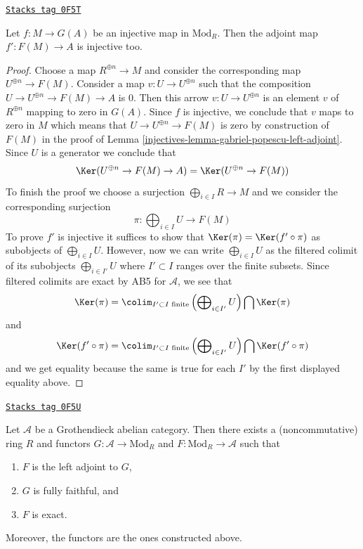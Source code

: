 \begin{lemma}[F G monos]
\label{injectives-lemma-F-G-monos}
\href{https://stacks.math.columbia.edu/tag/0F5T}{\texttt{Stacks tag 0F5T}}

Let $f : M \to G(A)$ be an injective map in $\text{Mod}_R$.
Then the adjoint map $f' : F(M) \to A$ is injective too.
\end{lemma}

\begin{proof}

Choose a map $R^{\oplus n} \to M$ and consider the corresponding map
$U^{\oplus n} \to F(M)$. Consider a map $v : U \to U^{\oplus n}$
such that the composition $U \to U^{\oplus n} \to F(M) \to A$ is $0$.
Then this arrow $v : U \to U^{\oplus n}$ is an element
$v$ of $R^{\oplus n}$ mapping to zero in $G(A)$. Since $f$ is injective,
we conclude that $v$ maps to zero in $M$ which means that
$U \to U^{\oplus n} \to F(M)$ is zero by construction of $F(M)$
in the proof of Lemma \ref{injectives-lemma-gabriel-popescu-left-adjoint}.
Since $U$ is a generator we conclude that
$$
\Ker(U^{\oplus n} \to F(M) \to A) = \Ker(U^{\oplus n} \to F(M))
$$
To finish the proof we choose a surjection $\bigoplus_{i \in I} R \to M$
and we consider the corresponding surjection
$$
\pi : \bigoplus\nolimits_{i \in I} U \longrightarrow F(M)
$$
To prove $f'$ is injective it suffices to show that
$\Ker(\pi) = \Ker(f' \circ \pi)$ as subobjects of $\bigoplus_{i \in I} U$.
However, now we can write $\bigoplus_{i \in I} U$ as the filtered colimit
of its subobjects $\bigoplus_{i \in I'} U$ where $I' \subset I$
ranges over the finite subsets. Since filtered colimits are
exact by AB5 for $\mathcal{A}$, we see that
$$
\Ker(\pi) =
\colim_{I' \subset I\text{ finite}}
\left(\bigoplus\nolimits_{i \in I'} U\right)
\bigcap \Ker(\pi)
$$
and
$$
\Ker(f' \circ \pi) =
\colim_{I' \subset I\text{ finite}}
\left(\bigoplus\nolimits_{i \in I'} U\right)
\bigcap \Ker(f' \circ \pi)
$$
and we get equality because the same is true for each $I'$ by
the first displayed equality above.
\end{proof}

\begin{theorem}
\label{injectives-theorem-gabriel-popescu}
\href{https://stacks.math.columbia.edu/tag/0F5U}{\texttt{Stacks tag 0F5U}}

Let $\mathcal{A}$ be a Grothendieck abelian category. Then there exists
a (noncommutative) ring $R$ and functors $G : \mathcal{A} \to \text{Mod}_R$
and $F : \text{Mod}_R \to \mathcal{A}$ such that
\begin{enumerate}
\item $F$ is the left adjoint to $G$,
\item $G$ is fully faithful, and
\item $F$ is exact.
\end{enumerate}
Moreover, the functors are the ones constructed above.
\end{theorem}

